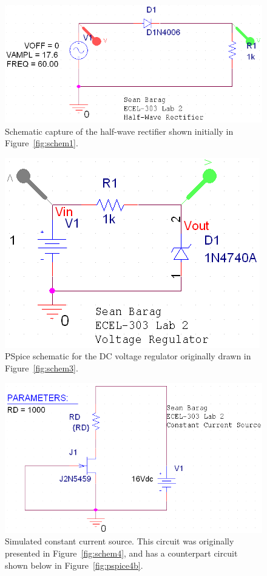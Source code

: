 \begin{figure}[H]
	\centering
	\includegraphics[width=.6\textwidth]{img/screen/halfwaveShot.PNG}
	\parbox{.6\textwidth}{
	\caption[PSpice screenshot --- Half-wave Rectifier]{Schematic capture of the
		half-wave rectifier shown initially in Figure~\ref{fig:schem1}.}
	\label{fig:pspice1}}
\end{figure}

\begin{figure}[H]
	\centering
	\includegraphics[width=.6\textwidth]{img/screen/voltageRegulatorShot.PNG}
	\parbox{.6\textwidth}{
	\caption[PSpice screenshot --- Voltage Regulator]{PSpice schematic for the DC
		voltage regulator originally drawn in Figure~\ref{fig:schem3}.}
	\label{fig:pspice3}}
\end{figure}

\begin{figure}[H]
	\centering
	\includegraphics[width=.6\textwidth]{img/screen/constantCurrent16Shot.PNG}
	\parbox{.6\textwidth}{
	\caption[PSpice screenshot --- Constant Current Source
		(\SI{16}{\volt})]{Simulated constant current source.  This circuit was
		originally presented in Figure~\ref{fig:schem4}, and has a counterpart
		circuit shown below in Figure~\ref{fig:pspice4b}.}
	\label{fig:pspice4a}}
\end{figure}

